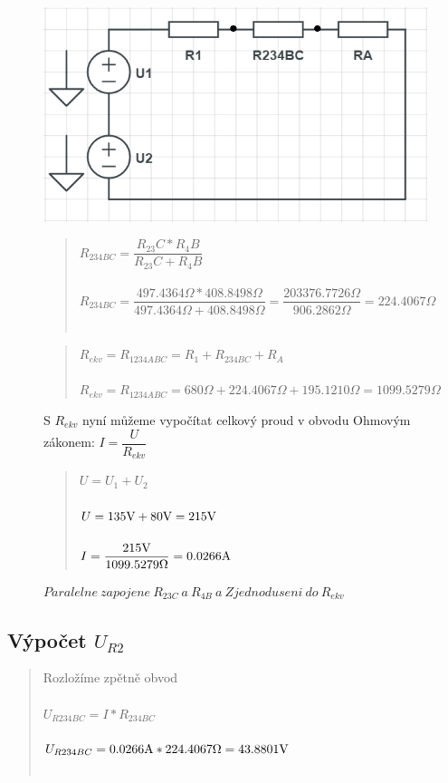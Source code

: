 \begin{figure}[H]
     \centering
     \includegraphics[scale=0.6]{pic1/u1o4.png}
     \caption{$Paralelne \: zapojene \: R_{23C} \: a \: R_{4B} \: a \: Zjednoduseni \: do \: R_{ekv}$}
     \label{fig:Paralel_resistor_R234BC}
     \begin{quote}
     \centering
     $R_{234BC} =  \dfrac{R_23C * R_4B}{R_23C + R_4B} $  \\~\\
     $R_{234BC} =  \dfrac{497.4364\Omega * 408.8498\Omega}{497.4364\Omega + 408.8498\Omega} = 
     \dfrac{203376.7726\Omega}{906.2862\Omega} = 224.4067\Omega$ \\~\\
\end{quote}
    \label{fig:REKV}
    \begin{quote}
    \centering
    $R_{ekv} = R_{1234ABC} = R_1 + R_{234BC} + R_A$  \\~\\
    $R_{ekv} = R_{1234ABC} = 680\Omega + 224.4067\Omega + 195.1210\Omega = 1099.5279 \Omega $  \\
    \end{quote}
    S $R_{ekv}$ nyní můžeme vypočítat celkový proud v obvodu Ohmovým zákonem: $I = \dfrac{U}{R_{ekv}}$
    \begin{quote}
    \centering
    $U = U_1 + U_2$ \\~\\
    $U = 135\Vo + 80\Vo = 215\Vo$ \\~\\
    $I = \dfrac{215\Vo}{1099.5279\Omega} = 0.0266\Am$
    \end{quote}
\end{figure}
    \subsection{Výpočet $U_{R2}$}
    \begin{quote}
    \centering
	Rozložíme zpětně obvod \\~\\
	$U_{R234BC} = I * R_{234BC}$ \\~\\
	$U_{R234BC} = 0.0266\Am * 224.4067\Omega = 43.8801\Vo$ \\~\\
    \end{quote}




